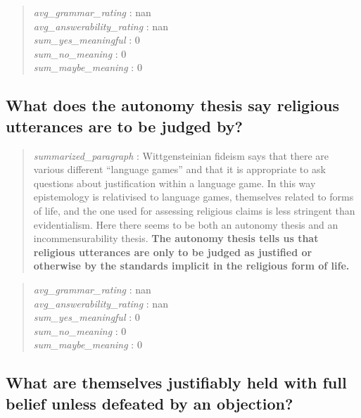 \begin{quote}
\emph{avg\_grammar\_rating} : nan\\
\emph{avg\_answerability\_rating} : nan\\
\emph{sum\_yes\_meaningful} : 0\\
\emph{sum\_no\_meaning} : 0\\
\emph{sum\_maybe\_meaning} : 0
\end{quote}

\hypertarget{what-does-the-autonomy-thesis-say-religious-utterances-are-to-be-judged-by}{%
\subsection{What does the autonomy thesis say religious utterances are
to be judged
by?}\label{what-does-the-autonomy-thesis-say-religious-utterances-are-to-be-judged-by}}

\begin{quote}
\emph{summarized\_paragraph} : Wittgensteinian fideism says that there
are various different ``language games'' and that it is appropriate to
ask questions about justification within a language game. In this way
epistemology is relativised to language games, themselves related to
forms of life, and the one used for assessing religious claims is less
stringent than evidentialism. Here there seems to be both an autonomy
thesis and an incommensurability thesis. \textbf{The autonomy thesis
tells us that religious utterances are only to be judged as justified or
otherwise by the standards implicit in the religious form of life.}
\end{quote}

\begin{quote}
\emph{avg\_grammar\_rating} : nan\\
\emph{avg\_answerability\_rating} : nan\\
\emph{sum\_yes\_meaningful} : 0\\
\emph{sum\_no\_meaning} : 0\\
\emph{sum\_maybe\_meaning} : 0
\end{quote}

\hypertarget{what-are-themselves-justifiably-held-with-full-belief-unless-defeated-by-an-objection}{%
\subsection{What are themselves justifiably held with full belief unless
defeated by an
objection?}\label{what-are-themselves-justifiably-held-with-full-belief-unless-defeated-by-an-objection}}

